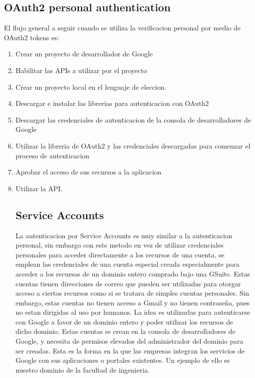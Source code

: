 \documentclass[titlepage]{article} %
\begin{document}
\subsection{OAuth2 personal authentication}
El flujo general a seguir cuando se utiliza la verificacion 
personal por medio de OAuth2 tokens es:
\begin{enumerate}
  \item Crear un proyecto de desarrollador de Google
  \item Habilitar las APIs a utilizar por el proyecto
  \item Crear un proyecto local en el lenguaje de eleccion.
  \item Descargar e instalar las librerias para autenticacion con OAuth2
  \item Descargar las credenciales de autenticacion de la consola de desarrolladores de Google
  \item Utilizar la libreria de OAuth2 y las credenciales descargadas para comenzar el proceso de autenticacion
  \item Aprobar el acceso de sus recursos a la aplicacion
  \item Utilizar la API.
    \subsection{Service Accounts}
    La autenticacion por Service Accounts es muy similar a la 
    autenticacion personal, sin embargo con este metodo en vez de utilizar
    credenciales personales para acceder directamente a los recursos 
    de una cuenta, se emplean las credenciales de una cuenta especial
    creada especialmente para acceder a los recursos de un dominio entero
    comprado bajo una GSuite. Estas cuentas tienen direcciones de correo
    que pueden ser utilizadas para otorgar acceso a ciertos recursos
    como si se tratara de simples cuentas personales. Sin embargo, estas
    cuentas no tienen acceso a Gmail y no tienen contraseña, pues
    no estan dirigidas al uso por humanos. La idea es utilizarlas para 
    autenticarse con Google a favor de un dominio entero y poder utilizar
    los recursos de dicho dominio. Estas cuentas
    se crean en la consola de desarrolladores de Google, y necesita 
    de permisos elevados del administrador del dominio para ser creadas.
    Esta es la forma en la que las empresas integran los servicios de 
    Google con sus aplicaciones o portales existentes. Un ejemplo de 
    ello es nuestro dominio de la facultad de ingenieria.

\end{enumerate}
\end{document}
